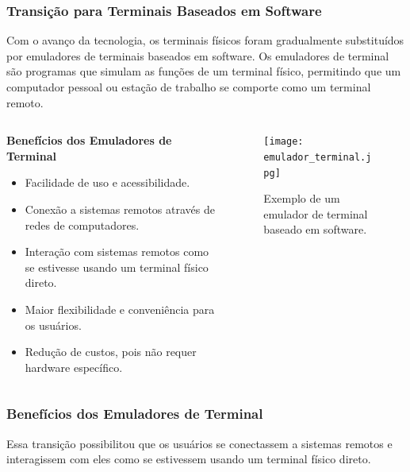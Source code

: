 \documentclass{beamer}
\begin{document}
      \begin{frame}
            \frametitle{Transição para Terminais Baseados em Software}
            
            Com o avanço da tecnologia, os terminais físicos foram gradualmente substituídos por emuladores de terminais baseados em software. Os emuladores de terminal são programas que simulam as funções de um terminal físico, permitindo que um computador pessoal ou estação de trabalho se comporte como um terminal remoto.
            
            \begin{columns}
            \begin{column}{0.6\textwidth}
            \textbf{Benefícios dos Emuladores de Terminal}
            \begin{itemize}
                \item Facilidade de uso e acessibilidade.
                \item Conexão a sistemas remotos através de redes de computadores.
                \item Interação com sistemas remotos como se estivesse usando um terminal físico direto.
                \item Maior flexibilidade e conveniência para os usuários.
                \item Redução de custos, pois não requer hardware específico.
            \end{itemize}
            \end{column}
            
            \begin{column}{0.4\textwidth}
            \begin{figure}
                \centering
                \texttt{[image: emulador\_terminal.jpg]}
                \caption{Exemplo de um emulador de terminal baseado em software.}
            \end{figure}
            \end{column}
            \end{columns}
            
           
            \end{frame}

            \begin{frame}\justifying
                  \frametitle{Benefícios dos Emuladores de Terminal}
                  Essa transição possibilitou que os usuários se conectassem a sistemas remotos e interagissem com eles como se estivessem usando um terminal físico direto.
            \end{frame}
            
\end{document}
